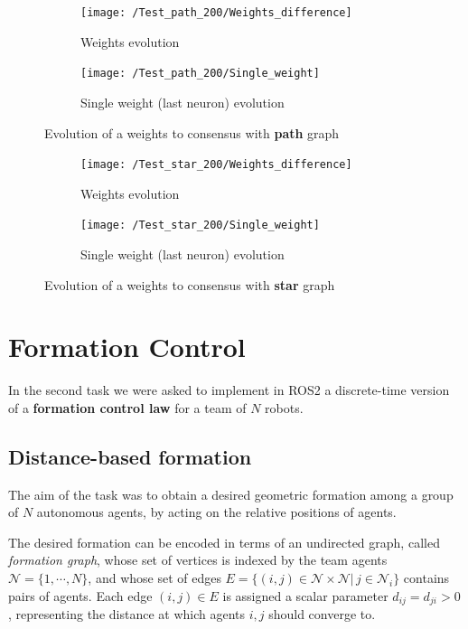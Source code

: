 \documentclass[a4paper,11pt,oneside]{book}
\begin{document}
\begin{figure}[h]
\centering
	\begin{subfigure}{0.49\textwidth}	
	\texttt{[image: /Test\_path\_200/Weights\_difference]}
	\caption{Weights evolution}
	\end{subfigure}
\hfill
	\begin{subfigure}{0.49\textwidth}	
	\texttt{[image: /Test\_path\_200/Single\_weight]}
	\caption{Single weight (last neuron) evolution}
	\end{subfigure}
\caption{Evolution of a weights to consensus with \textbf{path} graph}
\label{path_test}
\end{figure}

\begin{figure}[h]
\centering
	\begin{subfigure}{0.49\textwidth}	
	\texttt{[image: /Test\_star\_200/Weights\_difference]}
	\caption{Weights evolution}
	\end{subfigure}
\hfill
	\begin{subfigure}{0.49\textwidth}	
	\texttt{[image: /Test\_star\_200/Single\_weight]}
	\caption{Single weight (last neuron) evolution}
	\end{subfigure}
\caption{Evolution of a weights to consensus with \textbf{star }graph}
\label{path_test}
\end{figure}




\chapter{Formation Control} 
 In the second task we were asked to implement in ROS2 a discrete-time version of a \textbf{formation control law} for a team of $N$ robots.

\section{Distance-based formation}
The aim of the task was to obtain a desired geometric formation among a group of $N$ autonomous agents, by acting on the relative positions of agents.

\bigskip
The desired formation can be encoded in terms of an undirected graph, called \textit{formation graph}, whose set of vertices is indexed by the team agents $\mathcal{N} =\{ 1, \cdots, N\}$, and whose set of edges $E=\{(i,j) \in \mathcal{N} \times \mathcal{N} | \, j \in \mathcal{N}_i\}$ contains pairs of agents. Each edge $(i,j) \in E$ is assigned a scalar parameter $d_{ij} = d_{ji} > 0$, representing the distance at which agents $i,j$ should converge to. 
\end{document}
